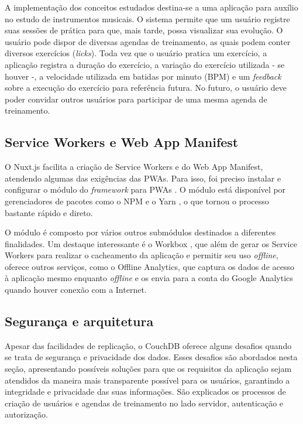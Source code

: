 \documentclass[
	article,			%
	12pt,				%
	oneside,			%
	a4paper,			%
	english,			%
	brazil,				%
	sumario=tradicional
	]{abntex2}
\begin{document}
A implementação dos conceitos estudados destina-se a uma aplicação para auxílio no estudo de instrumentos musicais. O sistema permite que um usuário registre suas sessões de prática para que, mais tarde, possa visualizar sua evolução. O usuário pode dispor de diversas agendas de treinamento, as quais podem conter diversos exercícios (\textit{licks}). Toda vez que o usuário pratica um exercício, a aplicação registra a duração do exercício, a variação do exercício utilizada - se houver -, a velocidade utilizada em batidas por minuto (BPM) e um \textit{feedback} sobre a execução do exercício para referência futura. No futuro, o usuário deve poder convidar outros usuários para participar de uma mesma agenda de treinamento.

\subsection{Service Workers e Web App Manifest}

O Nuxt.js facilita a criação de Service Workers e do Web App Manifest, atendendo algumas das exigências das PWAs. Para isso, foi preciso instalar e configurar o módulo do \textit{framework} para PWAs \cite{nuxt-pwa-2018}. O módulo está disponível por gerenciadores de pacotes como o NPM \cite{npm-2017} e o Yarn \cite{yarn-2017}, o que tornou o processo bastante rápido e direto.

O módulo é composto por vários outros submódulos destinados a diferentes finalidades. Um destaque interessante é o Workbox \cite{workbox-2018}, que além de gerar os Service Workers para realizar o cacheamento da aplicação e permitir seu uso \textit{offline}, oferece outros serviços, como o Offline Analytics, que captura os dados de acesso à aplicação mesmo enquanto \textit{offline} e os envia para a conta do Google Analytics quando houver conexão com a Internet.

\subsection{Segurança e arquitetura}

Apesar das facilidades de replicação, o CouchDB oferece alguns desafios quando se trata de segurança e privacidade dos dados. Esses desafios são abordados nesta seção, apresentando possíveis soluções para que os requisitos da aplicação sejam atendidos da maneira mais transparente possível para os usuários, garantindo a integridade e privacidade das suas informações. São explicados os processos de criação de usuários e agendas de treinamento no lado servidor, autenticação e autorização.
\end{document}
